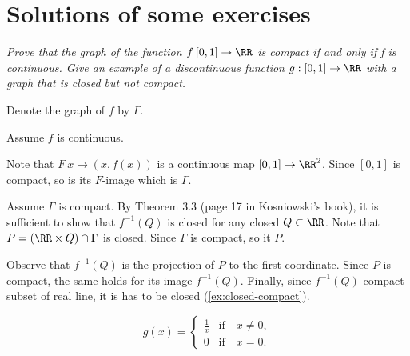 \chapter{Solutions of some exercises}

\textit{Prove that the graph of the function $f\: [0,1] \to \RR$ is compact if and
only if f is continuous.
Give an example of a discontinuous function
$g: [0,1] \to \RR$ with a graph that is closed but not compact.}

Denote the graph of $f$ by $\Gamma$.

Assume $f$ is continuous.

Note that $F\:x\mapsto (x,f(x))$ is a continuous map $[0,1]\to\RR^2$.
Since $[0,1]$ is compact, so is its $F$-image which is $\Gamma$.


Assume $\Gamma$ is compact.
By Theorem 3.3 (page 17 in Kosniowski's book), it is sufficient to show that $f^{-1}(Q)$ is closed for any closed $Q\subset \RR$.
Note that $P=(\RR\times Q)\cap\Gamma$ is closed.
Since $\Gamma$ is compact, so it $P$.

Observe that $f^{-1}(Q)$ is the projection of $P$ to the first coordinate.
Since $P$ is compact, the same holds for its image $f^{-1}(Q)$.
Finally, since $f^{-1}(Q)$ compact subset of real line, it is has to be closed (\ref{ex:closed-compact}).

\[g(x)=
\begin{cases}
\tfrac1x&\text{if}\quad x\ne0,
\\
0&\text{if}\quad x=0.
\end{cases}
\]
